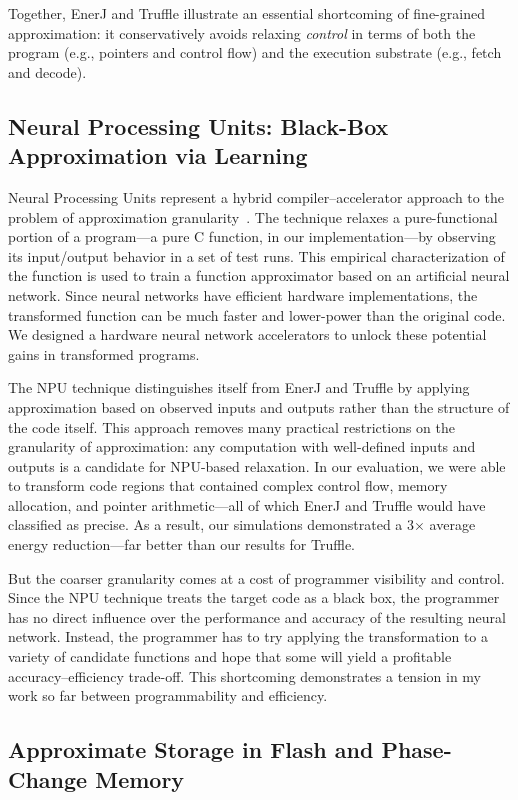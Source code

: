 Together, EnerJ and Truffle illustrate an essential shortcoming of
fine-grained approximation: it conservatively avoids relaxing \emph{control}
in terms of both the program (e.g., pointers and control flow) and the
execution substrate (e.g., fetch and decode).

\subsection{Neural Processing Units: Black-Box Approximation via Learning}

Neural Processing Units represent a hybrid compiler--accelerator approach to
the problem of approximation granularity~\cite{npu}. The technique relaxes a
pure-functional portion of a program---a pure C function, in our
implementation---by observing its input/output behavior in a set of test runs.
This empirical characterization of the function is used to train a function
approximator based on an artificial neural network. Since neural networks have
efficient hardware implementations, the transformed function can be much
faster and lower-power than the original code. We designed a hardware neural
network accelerators to unlock these potential gains in transformed programs.

The NPU technique distinguishes itself from EnerJ and Truffle by applying
approximation based on observed inputs and outputs rather than the structure
of the code itself. This approach removes many practical restrictions on the
granularity of approximation: any computation with well-defined inputs and
outputs is a candidate for NPU-based relaxation. In our evaluation, we were
able to transform code regions that contained complex control flow, memory
allocation, and pointer arithmetic---all of which EnerJ and Truffle would have
classified as precise. As a result, our simulations demonstrated a 3$\times$
average energy reduction---far better than our results for Truffle.

But the coarser granularity comes at a cost of programmer visibility and
control. Since the NPU technique treats the target code as a black box, the
programmer has no direct influence over the performance and accuracy of the
resulting neural network. Instead, the programmer has to try applying the
transformation to a variety of candidate functions and hope that some will
yield a profitable accuracy--efficiency trade-off.
This shortcoming demonstrates a tension in my work so far between
programmability and efficiency.

\subsection{Approximate Storage in Flash and Phase-Change Memory}

